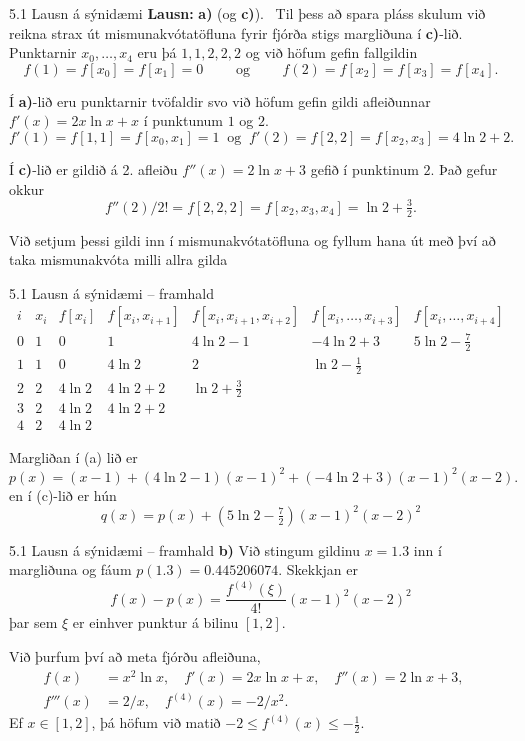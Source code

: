 \begin{frame}{5.1  Lausn á sýnidæmi} 
{\bf Lausn:}  {\bf a)} (og {\bf c)}).  \ Til þess að spara pláss 
skulum við reikna strax út
mismunakvótatöfluna fyrir fjórða stigs margliðuna í {\bf c)}-lið.
Punktarnir $x_0,\dots,x_4$ eru þá $1,1,2,2,2$ og við höfum gefin
fallgildin 
$$f(1)=f[x_0]=f[x_1]=0 \qquad  \text{ og } \qquad
f(2)=f[x_2]=f[x_3]=f[x_4].
$$

\pause
\smallskip
Í {\bf a)}-lið eru punktarnir tvöfaldir svo við höfum gefin 
gildi afleiðunnar  $f'(x)=2x\ln x+x$ í punktunum $1$ og $2$.
$$
f'(1)=f[1,1]=f[x_0,x_1]=1 \ \text{ og } \  
f'(2)=f[2,2]=f[x_2,x_3]=4\ln 2+2.
$$

\pause
\smallskip
Í {\bf c)}-lið er gildið á 2. afleiðu $f''(x)=2\ln x +3$ gefið
í punktinum $2$.  Það gefur okkur
$$f''(2)/2!=f[2,2,2]=f[x_2,x_3,x_4]=\ln 2+\tfrac 32.
$$   

\pause
Við setjum þessi gildi inn í mismunakvótatöfluna og 
fyllum hana út með því að taka mismunakvóta milli allra gilda 
\end{frame}

\begin{frame}{5.1 Lausn á sýnidæmi -- framhald} 
$$
\begin{matrix}
i&x_i & f[x_i] &f[x_i,x_{i+1}] & f[x_i,x_{i+1},x_{i+2}] &
f[x_i,\dots,x_{i+3}]&f[x_i,\dots,x_{i+4}] \\\hline
0&1&0     &1       &4\ln 2-1        &-4\ln 2+3& 5\ln 2-\tfrac 72\\
1&1&0     &4\ln 2  &2               &\ln 2-\tfrac 12\\
2&2&4\ln 2&4\ln 2+2&\ln 2+\tfrac 32\\
3&2&4\ln 2&4\ln 2+2\\
4&2&4\ln 2
\end{matrix}
$$

\pause
Margliðan í (a) lið er  
$$p(x)=(x-1)+(4\ln 2-1)(x-1)^2+(-4\ln 2+3)(x-1)^2(x-2).
$$
en í (c)-lið er hún
$$
q(x)=p(x)+(5\ln 2-\tfrac 72)(x-1)^2(x-2)^2
$$
\end{frame}

\begin{frame}{5.1 Lausn á sýnidæmi -- framhald} 
{\bf b)}  Við stingum gildinu $x=1.3$ inn í margliðuna og fáum
 $p(1.3)=0.445206074$. Skekkjan er
$$
f(x)-p(x)=\dfrac{f^{(4)}(\xi)}{4!}(x-1)^2(x-2)^2
$$ 
þar sem $\xi$ er einhver punktur á bilinu $[1,2]$.

\pause
\smallskip  
Við þurfum því að meta fjórðu afleiðuna,
\begin{align*}
f(x) &=x^2\ln x, \quad
f'(x)=2x\ln x+x, \quad
f''(x)=2\ln x+3, \quad
\\  
f'''(x)& =2/x, \quad
f^{(4)}(x)=-2/x^2.
\end{align*}
Ef $x\in [1,2]$, þá höfum við matið
$-2\leq f^{(4)}(x)\leq -\tfrac 12$. 
\end{frame}

